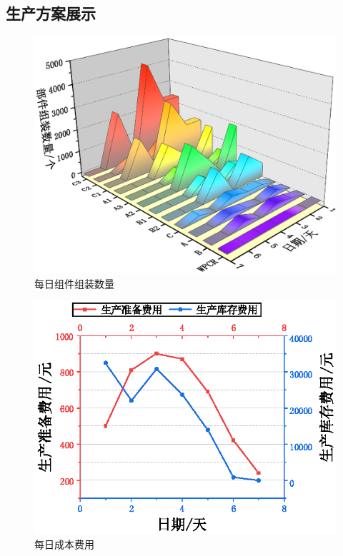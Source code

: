 \subsection{生产方案展示} %
\label{sub:生产方案展示}

\begin{figure}[!htbp]
	\centering
	\includegraphics{Image/问题二展示.eps}
	\caption{每日组件组装数量}\label{每日组件组装数量}
\end{figure}

\begin{figure}[!htbp]
	\centering
	\includegraphics{Image/问题二展示2.eps}
	\caption{每日成本费用}\label{每日成本费用}
\end{figure}


